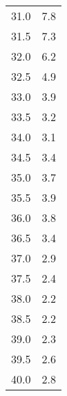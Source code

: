 \begin{table}
\begin{tabular}{S[]S[]}
31.0 & 7.8\\
31.5 & 7.3\\
32.0 & 6.2\\
32.5 & 4.9\\
33.0 & 3.9\\
33.5 & 3.2\\
34.0 & 3.1\\
34.5 & 3.4\\
35.0 & 3.7\\
35.5 & 3.9\\
36.0 & 3.8\\
36.5 & 3.4\\
37.0 & 2.9\\
37.5 & 2.4\\
38.0 & 2.2\\
38.5 & 2.2\\
39.0 & 2.3\\
39.5 & 2.6\\
40.0 & 2.8\\
\bottomrule
\end{tabular}\end{table}